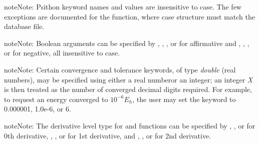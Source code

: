 \documentclass[letterpaper,10pt,english]{sphinxmanual}
\begin{document}
\begin{notice}{note}{Note:}
Psithon keyword names and values are insensitive to case. The few
exceptions are documented for the  function, where case
structure must match the database file.
\end{notice}
\label{index:bool}\label{index:boolean}
\begin{notice}{note}{Note:}
Boolean arguments can be specified by , , , or 
for affirmative and , , , or  for negative,
all insensitive to case.
\end{notice}
\label{index:conv-double}
\begin{notice}{note}{Note:}
Certain convergence and tolerance keywords, of type \emph{double} (real numbers), may be specified using either a real numberor an integer; an integer \emph{X} is then treated as the number of converged decimal digits required. For example, to request an energy converged to $10^{-6} E_h$, the user may set the  keyword to 0.000001, 1.0e-6, or 6.
\end{notice}
\label{index:dertype-string}
\begin{notice}{note}{Note:}
The derivative level type for {\hyperref[index:driver.optimize]{}} and {\hyperref[index:driver.frequency]{}}
functions can be specified by , , or  for 0th derivative,
, , or  for 1st derivative, and ,
, or  for 2nd derivative.
\end{notice}
\end{document}
